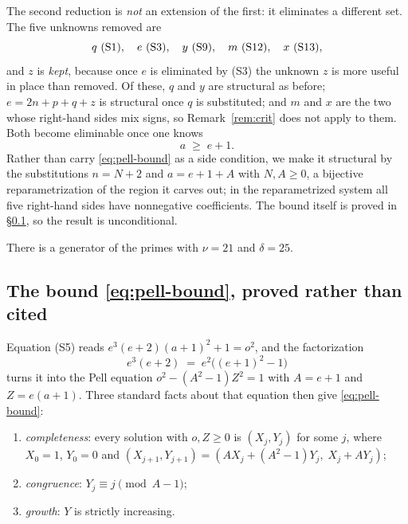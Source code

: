 The second reduction is \emph{not} an extension of the first: it eliminates a
different set. The five unknowns removed are
\[
  q\ \textup{(S1)},\quad e\ \textup{(S3)},\quad y\ \textup{(S9)},\quad
  m\ \textup{(S12)},\quad x\ \textup{(S13)},
\]
and $z$ is \emph{kept}, because once $e$ is eliminated by \textup{(S3)} the
unknown $z$ is more useful in place than removed. Of these, $q$ and $y$ are
structural as before; $e=2n+p+q+z$ is structural once $q$ is substituted; and
$m$ and $x$ are the two whose right-hand sides mix signs, so
Remark~\ref{rem:crit} does not apply to them. Both become eliminable once one
knows
\begin{equation}
  \label{eq:pell-bound}
  a \;\ge\; e+1 .
\end{equation}
Rather than carry \eqref{eq:pell-bound} as a side condition, we make it
structural by the substitutions $n=N+2$ and $a=e+1+A$ with $N,A\ge0$, a
bijective reparametrization of the region it carves out; in the reparametrized
system all five right-hand sides have nonnegative coefficients. The bound
itself is proved in \S\ref{ssec:pell}, so the result is unconditional.

\begin{theorem}
\label{thm:21}
There is a generator of the primes with $\nu=21$ and $\delta=25$.
\end{theorem}

\subsection{The bound \texorpdfstring{\eqref{eq:pell-bound}}{a >= e+1}, proved rather than cited}
\label{ssec:pell}

Equation \textup{(S5)} reads $e^3(e+2)(a+1)^2+1=o^2$, and the factorization
\[
  e^3(e+2)\;=\;e^2\bigl((e+1)^2-1\bigr)
\]
turns it into the Pell equation $o^2-(A^2-1)Z^2=1$ with $A=e+1$ and $Z=e(a+1)$.
Three standard facts about that equation then give \eqref{eq:pell-bound}:

\begin{enumerate}[label=(P\arabic*),nosep]
  \item \emph{completeness}: every solution with $o,Z\ge0$ is $(X_j,Y_j)$ for
        some $j$, where $X_0=1$, $Y_0=0$ and
        $(X_{j+1},Y_{j+1})=(AX_j+(A^2-1)Y_j,\;X_j+AY_j)$;
  \item \emph{congruence}: $Y_j\equiv j \pmod{A-1}$;
  \item \emph{growth}: $Y$ is strictly increasing.
\end{enumerate}

